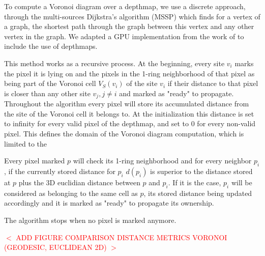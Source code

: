\documentclass[11pt,fleqn]{book} %
\newcommand{\arnaud}[1]{\textcolor{red}{$<$ #1 $>$}}
\begin{document}
To compute a Voronoi diagram over a depthmap, we use a discrete approach, through the multi-sources Dijkstra's algorithm (MSSP) \cite{Dij59} which finds for a vertex of a graph, the shortest path through the graph between this vertex and any other vertex in the graph.
We adapted a GPU implementation from the work of \cite{PPA16} to include the use of depthmaps.

This method works as a recursive process. 
At the beginning, every site $v_i$ marks the pixel it is lying on and the pixels in the 1-ring neighborhood of that pixel as being part of the Voronoi cell $V_S(v_i)$ of the site $v_i$ if their distance to that pixel is closer than any other site $v_j, j \neq i$ and marked as "ready" to propagate.
Throughout the algorithm every pixel will store its accumulated distance from the site of the Voronoi cell it belongs to. 
At the initialization this distance is set to infinity for every valid pixel of the depthmap, and set to 0 for every non-valid pixel.
This defines the domain of the Voronoi diagram computation, which is limited to the 

Every pixel marked $p$ will check its 1-ring neighborhood and for every neighbor $p_i$, if the currently stored distance for $p_i$ $d(p_i)$ is superior to the distance stored at $p$ plus the 3D euclidian distance between $p$ and $p_i$. 
If it is the case, $p_i$ will be considered as belonging to the same cell as $p$, its stored distance being updated accordingly and it is marked as "ready" to propagate its ownership.

The algorithm stops when no pixel is marked anymore.

\arnaud{ADD FIGURE COMPARISON DISTANCE METRICS VORONOI (GEODESIC, EUCLIDEAN 2D)}
\end{document}
